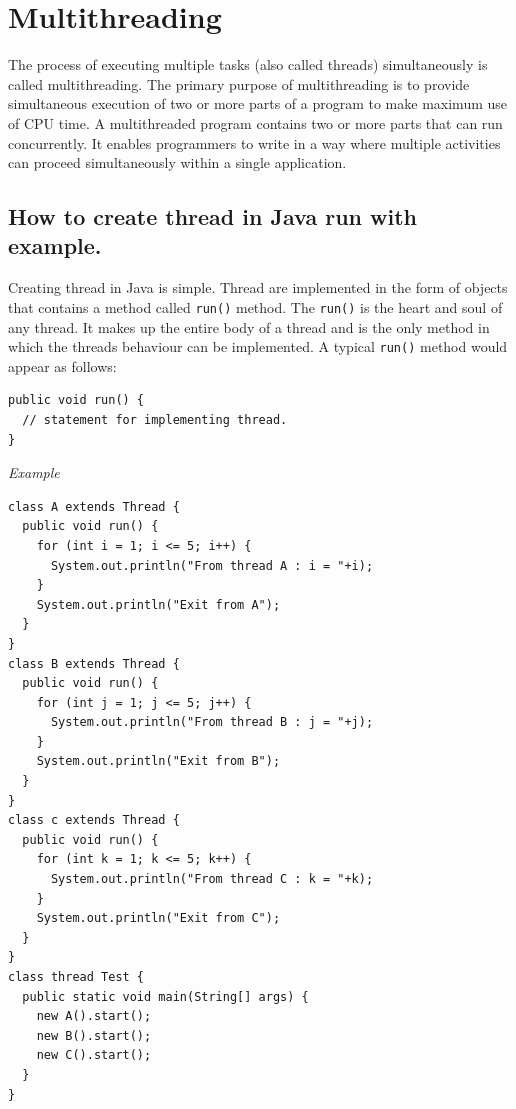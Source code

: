 \documentclass[twocolumn, a4paper]{article}
\begin{document}
\section{Multithreading}
The process of executing multiple tasks (also called threads) simultaneously
is called multithreading. The primary purpose of multithreading is to provide
simultaneous execution of two or more parts of a program to make maximum use
of CPU time. A multithreaded program contains two or more parts that can run
concurrently. It enables programmers to write in a way where multiple
activities can proceed simultaneously within a single application.

\subsection{How to create thread in Java run with example.}
Creating thread in Java is simple. Thread are implemented in the form of
objects that contains a method called \verb+run()+ method. The \verb+run()+ is
the heart and soul of any thread. It makes up the entire body of a thread and
is the only method in which the threads behaviour can be implemented. A
typical \verb+run()+ method would appear as follows:
\begin{lstlisting}
public void run() {
  // statement for implementing thread.
}
\end{lstlisting}

\noindent\emph{Example}
\begin{lstlisting}
class A extends Thread {
  public void run() {
    for (int i = 1; i <= 5; i++) {
      System.out.println("From thread A : i = "+i);
    }
    System.out.println("Exit from A");
  }
}
class B extends Thread {
  public void run() {
    for (int j = 1; j <= 5; j++) {
      System.out.println("From thread B : j = "+j);
    }
    System.out.println("Exit from B");
  }
}
class c extends Thread {
  public void run() {
    for (int k = 1; k <= 5; k++) {
      System.out.println("From thread C : k = "+k);
    }
    System.out.println("Exit from C");
  }
}
class thread Test {
  public static void main(String[] args) {
    new A().start();
    new B().start();
    new C().start();
  }
}
\end{lstlisting}
\end{document}
